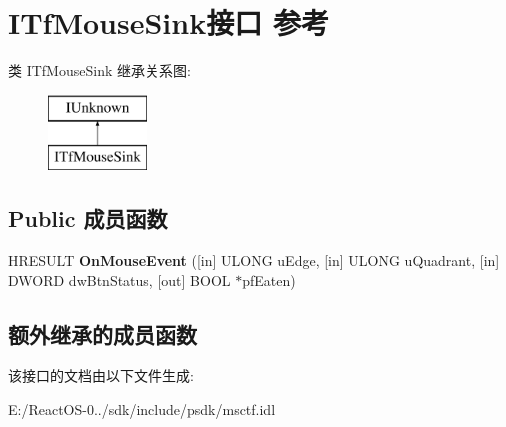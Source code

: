 \hypertarget{interface_i_tf_mouse_sink}{}\section{I\+Tf\+Mouse\+Sink接口 参考}
\label{interface_i_tf_mouse_sink}
类 I\+Tf\+Mouse\+Sink 继承关系图\+:\begin{figure}[H]
\begin{center}
\leavevmode
\includegraphics[height=2.000000cm]{interface_i_tf_mouse_sink}
\end{center}
\end{figure}
\subsection*{Public 成员函数}
\begin{DoxyCompactItemize}
\item 
\mbox{\label{interface_i_tf_mouse_sink_a5bf6ca5b6f0bad0cfce6034f03f6842a}} 
H\+R\+E\+S\+U\+LT {\bfseries On\+Mouse\+Event} (\mbox{[}in\mbox{]} U\+L\+O\+NG u\+Edge, \mbox{[}in\mbox{]} U\+L\+O\+NG u\+Quadrant, \mbox{[}in\mbox{]} D\+W\+O\+RD dw\+Btn\+Status, \mbox{[}out\mbox{]} B\+O\+OL $\ast$pf\+Eaten)
\end{DoxyCompactItemize}
\subsection*{额外继承的成员函数}


该接口的文档由以下文件生成\+:\begin{DoxyCompactItemize}
\item 
E\+:/\+React\+O\+S-\/0../sdk/include/psdk/msctf.\+idl\end{DoxyCompactItemize}
